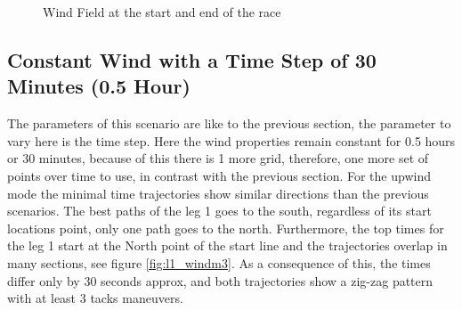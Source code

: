 \begin{figure} [hbt!]
  \centering
  \hfill
  \caption{Wind Field at the start and end of the race} %
\label{fig:m6_windprop}
\end{figure}

\subsection{Constant Wind with a Time Step of 30 Minutes (0.5 Hour)}

The parameters of this scenario are like to the previous section, the parameter to vary here is the time step. Here the wind properties remain constant for 0.5 hours or 30 minutes, because of this there is 1 more grid, therefore, one more set of points over time to use, in contrast with the previous section. For the upwind mode the minimal time trajectories show similar directions than the previous scenarios. The best paths of the leg 1 goes to the south, regardless of its start locations point, only one path goes to the north. Furthermore, the top times for the leg 1 start at the North point of the start line and the trajectories overlap in many sections, see figure \ref{fig:l1_windm3}. As a consequence of this, the times differ only by 30 seconds approx, and both trajectories show a zig-zag pattern with at least 3 tacks maneuvers. \par \noindent 

